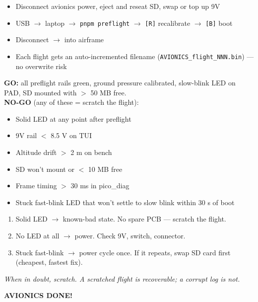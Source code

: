 \documentclass[11pt,a4paper,oneside]{report}
\newcommand{\done}[1]{\bigskip\begin{center}\sffamily\bfseries\Large\textcolor{rocketred}{#1}\end{center}\bigskip}
\begin{document}
\begin{itemize}
  \item Disconnect avionics power, eject and reseat SD, swap or top up 9V
  \item USB $\to$ laptop $\to$ \texttt{pnpm preflight} $\to$ \texttt{[R]} recalibrate $\to$ \texttt{[B]} boot
  \item Disconnect $\to$ into airframe
  \item Each flight gets an auto-incremented filename (\texttt{AVIONICS\_flight\_NNN.bin}) --- no overwrite risk
\end{itemize}

\begin{gobox}
\textbf{GO:} all preflight rails green, ground pressure calibrated, slow-blink LED on PAD, SD mounted with $>$ 50 MB free. \\[4pt]
\textbf{NO-GO} (any of these = scratch the flight):
\begin{itemize}
  \item Solid LED at any point after preflight
  \item 9V rail $<$ 8.5 V on TUI
  \item Altitude drift $>$ 2 m on bench
  \item SD won't mount or $<$ 10 MB free
  \item Frame timing $>$ 30 ms in pico\_diag
  \item Stuck fast-blink LED that won't settle to slow blink within 30 s of boot
\end{itemize}
\end{gobox}

\begin{enumerate}
  \item Solid LED $\to$ known-bad state. No spare PCB --- scratch the flight.
  \item No LED at all $\to$ power. Check 9V, switch, connector.
  \item Stuck fast-blink $\to$ power cycle once. If it repeats, swap SD card first (cheapest, fastest fix).
\end{enumerate}

\textit{When in doubt, scratch. A scratched flight is recoverable; a corrupt log is not.}

\done{AVIONICS DONE!}

\end{document}
